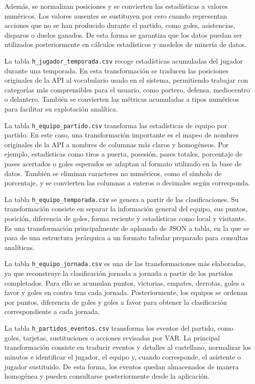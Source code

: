 Además, se normalizan posiciones y se convierten las estadísticas a valores numéricos. Los valores ausentes se sustituyen por cero cuando representan acciones que no se han producido durante el partido, como goles, asistencias, disparos o duelos ganados. De esta forma se garantiza que los datos puedan ser utilizados posteriormente en cálculos estadísticos y modelos de minería de datos.

La tabla \texttt{h\_jugador\_temporada.csv} recoge estadísticas acumuladas del jugador durante una temporada. En esta transformación se traducen las posiciones originales de la API al vocabulario usado en el sistema, permitiendo trabajar con categorías más comprensibles para el usuario, como portero, defensa, mediocentro o delantero. También se convierten las métricas acumuladas a tipos numéricos para facilitar su explotación analítica.

La tabla \texttt{h\_equipo\_partido.csv} transforma las estadísticas de equipo por partido. En este caso, una transformación importante es el mapeo de nombres originales de la API a nombres de columnas más claros y homogéneos. Por ejemplo, estadísticas como tiros a puerta, posesión, pases totales, porcentaje de pases acertados o goles esperados se adaptan al formato utilizado en la base de datos. También se eliminan caracteres no numéricos, como el símbolo de porcentaje, y se convierten las columnas a enteros o decimales según corresponda.

La tabla \texttt{h\_equipo\_temporada.csv} se genera a partir de las clasificaciones. Su transformación consiste en separar la información general del equipo, sus puntos, posición, diferencia de goles, forma reciente y estadísticas como local y visitante. Es una transformación principalmente de aplanado de JSON a tabla, en la que se pasa de una estructura jerárquica a un formato tabular preparado para consultas analíticas.

La tabla \texttt{h\_equipo\_jornada.csv} es una de las transformaciones más elaboradas, ya que reconstruye la clasificación jornada a jornada a partir de los partidos completados. Para ello se acumulan puntos, victorias, empates, derrotas, goles a favor y goles en contra tras cada jornada. Posteriormente, los equipos se ordenan por puntos, diferencia de goles y goles a favor para obtener la clasificación correspondiente a cada jornada.

La tabla \texttt{h\_partidos\_eventos.csv} transforma los eventos del partido, como goles, tarjetas, sustituciones o acciones revisadas por VAR. La principal transformación consiste en traducir eventos y detalles al castellano, normalizar los minutos e identificar el jugador, el equipo y, cuando corresponde, el asistente o jugador sustituido. De esta forma, los eventos quedan almacenados de manera homogénea y pueden consultarse posteriormente desde la aplicación.

